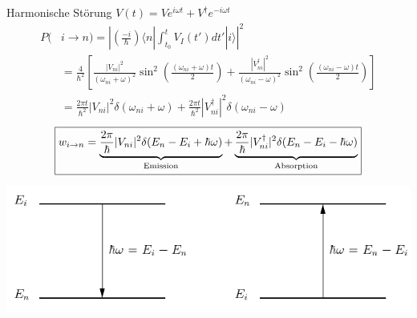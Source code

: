 




{\Huge
Harmonische Störung \(V(t)=Ve^{i\omega t} + V^\dagger e^{-i\omega t}\)
\begin{align*}
   P(&i\rightarrow n) = \left|(\frac{-i}{\hbar})\langle n |\int_{t_0}^t V_I(t')dt'|i\rangle\right|^2 \\
&=  \frac{4}{\hbar^2} \left[  \frac{|V_{ni}|^2}{(\omega_{ni}+\omega)^2}\sin^2\left(\frac{(\omega_{ni}+\omega) t}{2}\right)  +   \frac{|V^\dagger_{ni}|^2}{(\omega_{ni}-\omega)^2}\sin^2\left(\frac{(\omega_{ni}-\omega) t}{2}\right) \right]\\
&= \frac{2\pi t}{\hbar^2}|V_{ni}|^2 \delta(\omega_{ni}+\omega) + \frac{2\pi t}{\hbar^2}|V_{ni}^\dagger|^2 \delta(\omega_{ni}-\omega)
\end{align*}
\begin{align*}
\boxed{  w_{i\rightarrow n} = \underbr{\frac{2\pi}{\hbar}|V_{ni}|^2 \delta(E_n - E_i + \hbar\omega )}_{\text{Emission}} + \underbr{\frac{2\pi}{\hbar}|V_{ni}^\dagger|^2 \delta(E_n - E_i - \hbar\omega)}_{\text{Absorption}} }
\end{align*}
\begin{center}
\includegraphics[scale=0.3]{emission_absorption.png}
\end{center}
}%

